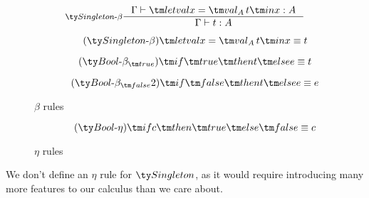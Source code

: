

\begin{figure*}[h]
  \[
  \inference[$\Singleton$-$\beta$]
            { \Gamma \vdash \letval x {\val[A][t]} x : A
            }
            {\Gamma \vdash t : A}
  \]

  \begin{equation}
    \tag{$\Singleton$-$\beta$}
    \letval x {\val[A][t]} x \equiv t
  \end{equation}

  \begin{equation}
    \tag{$\Bool$-$\beta_{\true}$}
    \ite \true t e \equiv t
  \end{equation}

  \begin{equation}
    \tag{$\Bool$-$\beta_{\false}2$}
    \ite \false t e \equiv e
  \end{equation}

  \caption*{$\beta$ rules}
  \label{fig:dt-singletons-beta}
\end{figure*}

\begin{figure*}[h]
  \begin{equation}
    \tag{$\Bool$-$\eta$}
    \ite c \true \false \equiv c
  \end{equation}

  \caption*{$\eta$ rules}
  \label{fig:dt-singletons-eta}
\end{figure*}

We don't define an $\eta$ rule for $\Singleton$, as it would require introducing many more features to our calculus than we care about.
